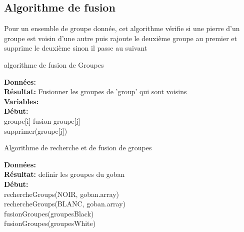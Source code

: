     \subsection{Algorithme de fusion}
    Pour un ensemble de groupe donnée, cet algorithme vérifie si une pierre d'un groupe est voisin d'une autre  puis rajoute le deuxième groupe au premier et supprime le deuxième sinon il passe au suivant
    
    \begin{algorithme}
       \caption{algorithme de fusion de Groupes}
       \textbf{Données:} 
        \\
        \textbf{Résultat:} Fusionner les groupes de 'group' qui sont voisins\\
        \textbf{Variables:}
              \\
        \textbf{Début:}\\
                        {
                            { 
                                { 
                                    {  groupe[i] fusion groupe[j]\\   supprimer(groupe[j])
                                    }
                                }      
                            }
                        }
    \end{algorithme}
    
    
    \begin{algorithme}
    \caption{Algorithme de recherche et de fusion de groupes}
    \textbf{Données:}
    \\
    \textbf{Résultat:} definir les groupes du goban\\
    \textbf{Début:}\\
    
            rechercheGroups(NOIR, goban.array)\\
            rechercheGroups(BLANC, goban.array)\\
            fusionGroupes(groupesBlack)\\
            fusionGroupes(groupesWhite)
    \end{algorithme}
    
